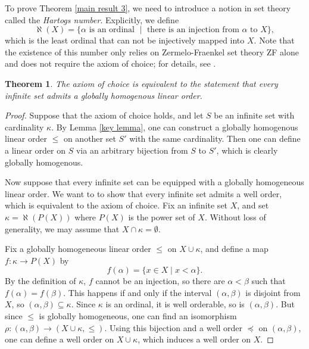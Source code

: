 \documentclass[11pt, reqno]{amsart}
\theoremstyle{plain}
\newtheorem{theorem}{Theorem}[section]
\numberwithin{equation}{section}
\theoremstyle{definition}
\begin{document}
To prove Theorem \ref{main result 3}, we need to introduce a notion in set theory called the \textit{Hartogs number}. Explicitly, we define
\[
\aleph(X) = \{\alpha \text{ is an ordinal } \mid \text{ there is an injection from $\alpha$ to } X \},
\]
which is the least ordinal that can not be injectively mapped into $X$. Note that the existence of this number only relies on Zermelo-Fraenkel set theory {\rm ZF} alone and does not require the axiom of choice; for details, see \cite{Hartogs}.

\begin{theorem} \label{homogeneous linear order is possible}
The axiom of choice is equivalent to the statement that every infinite set admits a globally homogenous linear order.
\end{theorem}

\begin{proof}
Suppose that the axiom of choice holds, and let $S$ be an infinite set with cardinality $\kappa$. By Lemma \ref{key lemma}, one can construct a globally homogenous linear order $\leqslant$ on another set $S'$ with the same cardinality. Then one can define a linear order on $S$ via an arbitrary bijection from $S$ to $S'$, which is clearly globally homogenous.

Now suppose that every infinite set can be equipped with a globally homogeneous linear order. We want to to show that every infinite set admits a well order, which is equivalent to the axiom of choice. Fix an infinite set $X$, and set $\kappa = \aleph(P(X))$ where $P(X)$ is the power set of $X$. Without loss of generality, we may assume that $X \cap \kappa = \emptyset$.

Fix a globally homogeneous linear order $\leqslant$ on $X \cup \kappa$, and define a map $f: \kappa \rightarrow P(X)$ by
\[
f(\alpha) = \{x \in X \mid x < \alpha\}.
\]
By the definition of $\kappa$, $f$ cannot be an injection, so there are $\alpha < \beta$ such that $f(\alpha) = f(\beta)$. This happens if and only if the interval $(\alpha, \beta)$ is disjoint from $X$, so $(\alpha, \beta) \subseteq \kappa$. Since $\kappa$ is an ordinal, it is well orderable, so is $(\alpha, \beta)$. But since $\leqslant$ is globally homogeneous, one can find an isomorphism $\rho: (\alpha, \beta) \to (X \cup \kappa, \leqslant)$. Using this bijection and a well order $\preccurlyeq$ on $(\alpha, \beta)$, one can define a well order on $X \cup \kappa$, which induces a well order on $X$.
\end{proof}
\end{document}
